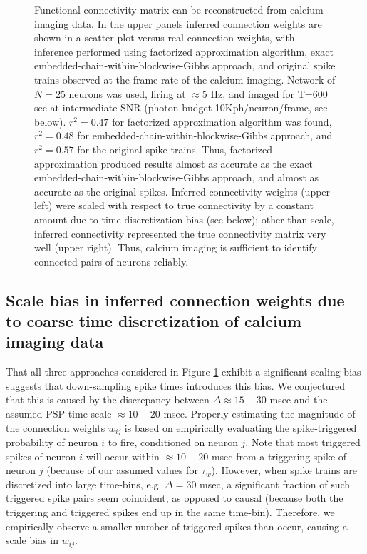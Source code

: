 \begin{figure}[h]
\caption{Functional connectivity matrix can be reconstructed from calcium imaging data. In the upper panels inferred connection weights are shown in a scatter plot versus real connection weights, with inference performed using factorized approximation algorithm, exact embedded-chain-within-blockwise-Gibbs approach, and original spike trains observed at the frame rate of the calcium imaging. Network of $N=25$ neurons was used, firing at $\approx 5$ Hz, and imaged for T=600 sec at intermediate SNR (photon budget 10Kph/neuron/frame, see below). $r^2=0.47$ for factorized approximation algorithm was found, $r^2=0.48$ for embedded-chain-within-blockwise-Gibbs approach, and $r^2=0.57$ for the original spike trains. Thus, factorized approximation produced results almost as accurate as the exact embedded-chain-within-blockwise-Gibbs approach, and almost as accurate as the original spikes. Inferred connectivity weights (upper left) were scaled with respect to true connectivity by a constant amount due to time discretization bias (see below); other than scale, inferred connectivity represented the true connectivity matrix very well (upper right). Thus, calcium imaging is sufficient to identify connected pairs of neurons reliably.} \label{fig:scatters} \end{figure}

\subsection{Scale bias in inferred connection weights due to coarse time discretization of calcium imaging data}

That all three approaches considered in Figure \ref{fig:scatters} exhibit a significant scaling bias suggests that down-sampling spike times introduces this bias.  We conjectured that this is caused by the discrepancy between $\Delta \approx 15-30$ msec and the assumed PSP time scale $\approx 10-20$ msec. Properly estimating the magnitude of the connection weights $w_{ij}$ is based on empirically evaluating the spike-triggered probability of neuron $i$ to fire, conditioned on neuron $j$. Note that most triggered spikes of neuron $i$ will occur within $\approx 10-20$ msec from a triggering spike of neuron $j$ (because of our assumed values for $\tau_w$). However, when spike trains are discretized into large time-bins, e.g. $\Delta = 30$ msec, a significant fraction of such triggered spike pairs seem coincident, as opposed to causal (because both the triggering and triggered spikes end up in the same time-bin). Therefore, we empirically observe a smaller number of triggered spikes than occur, causing a scale bias in $w_{ij}$.


